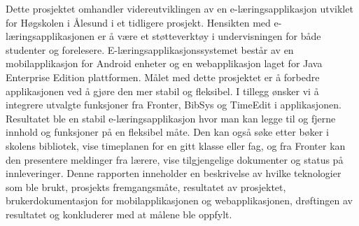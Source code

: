 \documentclass[../main.tex]{subfiles}
\begin{document}
Dette prosjektet omhandler videreutviklingen av en e-læringsapplikasjon utviklet for Høgskolen i Ålesund i et tidligere prosjekt. Hensikten med e-læringsapplikasjonen er å være et støtteverktøy i undervisningen for både studenter og forelesere.\newline
E-læringsapplikasjonssystemet består av en mobilapplikasjon for Android enheter og en webapplikasjon laget for Java Enterprise Edition plattformen.\newline
\newline
Målet med dette prosjektet er å forbedre applikasjonen ved å gjøre den mer stabil og fleksibel. I tillegg ønsker vi å integrere utvalgte funksjoner fra Fronter, BibSys og TimeEdit i applikasjonen.\newline
\newline
Resultatet ble en stabil e-læringsapplikasjon hvor man kan legge til og fjerne innhold og funksjoner på en fleksibel måte. Den kan også søke etter bøker i skolens bibliotek, vise timeplanen for en gitt klasse eller fag, og fra Fronter kan den presentere meldinger fra lærere, vise tilgjengelige dokumenter og status på innleveringer.\newline
\newline
Denne rapporten inneholder en beskrivelse av hvilke teknologier som ble brukt, prosjekts fremgangsmåte, resultatet av prosjektet, brukerdokumentasjon for mobilapplikasjonen og webapplikasjonen, drøftingen av resultatet og konkluderer med at målene ble oppfylt.
\end{document}
